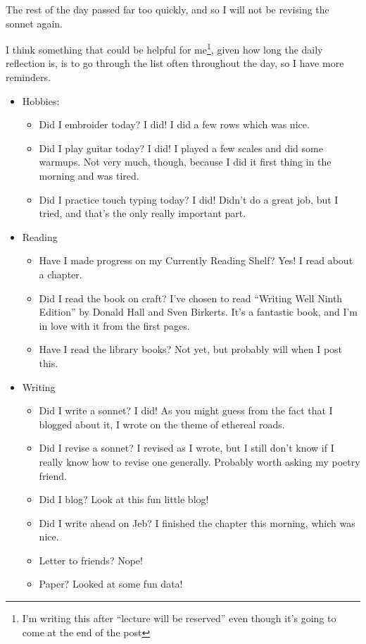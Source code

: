 \documentclass[12pt]{article}[titlepage]
\newcommand{\say}[1]{``#1''}
\newcommand{\1}{\={a}}
\newcommand{\2}{\={e}}
\newcommand{\3}{\={\i}}
\newcommand{\4}{\=o}
\newcommand{\5}{\=u}
\newcommand{\6}{\={A}}
\renewcommand{\,}{\textsuperscript{,}}
\begin{document}
The rest of the day passed far too quickly, and so I will not be revising the sonnet again. 
 
I think something that could be helpful for me\footnote{I'm writing this after \say{lecture will be reserved} even though it's going to come at the end of the post}, given how long the daily reflection is, is to go through the list often throughout the day, so I have more reminders.
 
\begin{itemize}
\item Hobbies:
\begin{itemize}
\item Did I embroider today? I did! I did a few rows which was nice. 
\item Did I play guitar today? I did! I played a few scales and did some warmups. Not very much, though, because I did it first thing in the morning and was tired. 
\item Did I practice touch typing today? I did! Didn't do a great job, but I tried, and that's the only really important part. 
\end{itemize}
\item Reading
\begin{itemize}
\item Have I made progress on my Currently Reading Shelf? Yes! I read about a chapter. 
\item Did I read the book on craft? I've chosen to read \say{Writing Well Ninth Edition} by Donald Hall and Sven Birkerts. It's a fantastic book, and I'm in love with it from the first pages. 
\item Have I read the library books? Not yet, but probably will when I post this. 
\end{itemize}
\item Writing
\begin{itemize}
\item Did I write a sonnet? I did! As you might guess from the fact that I blogged about it, I wrote on the theme of ethereal roads. 
\item Did I revise a sonnet? I revised as I wrote, but I still don't know if I really know how to revise one generally. Probably worth asking my poetry friend. 
\item Did I blog? Look at this fun little blog! 
\item Did I write ahead on Jeb? I finished the chapter this morning, which was nice. 
\item Letter to friends? Nope! 
\item Paper? Looked at some fun data! 

\end{itemize}
\end{itemize}
\end{document}
